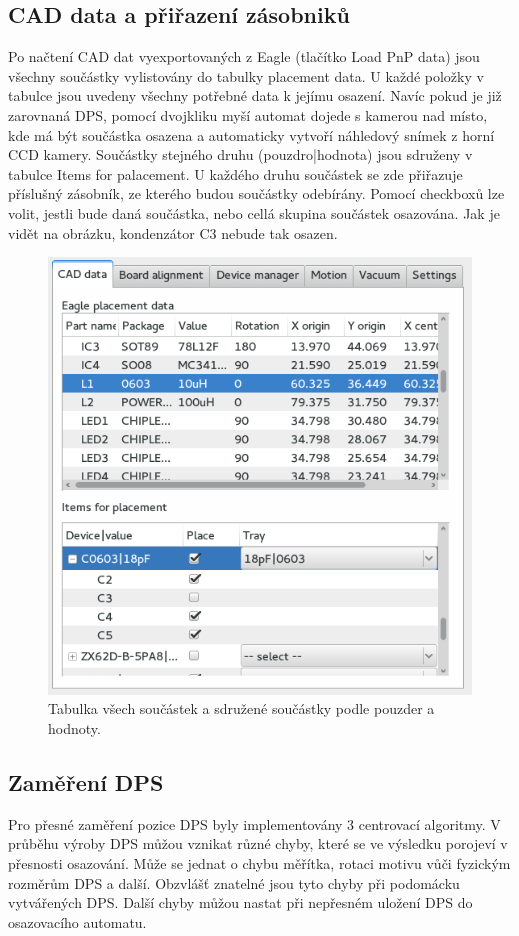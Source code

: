 \subsection{CAD data a přiřazení zásobniků}
Po načtení CAD dat vyexportovaných z Eagle (tlačítko Load PnP data) jsou všechny součástky vylistovány do tabulky placement data. U každé položky v tabulce jsou uvedeny všechny potřebné data k jejímu osazení. Navíc pokud je již zarovnaná DPS, pomocí dvojkliku myší automat dojede s kamerou nad místo, kde má být součástka osazena a automaticky vytvoří náhledový snímek z horní CCD kamery.
Součástky stejného druhu (pouzdro|hodnota) jsou sdruženy v tabulce Items for palacement. U každého druhu součástek se zde přiřazuje příslušný zásobník, ze kterého budou součástky odebírány. Pomocí checkboxů lze volit, jestli bude daná součástka, nebo cellá skupina součástek osazována. Jak je vidět na obrázku, kondenzátor C3 nebude tak osazen.
\begin{figure}[h!]
  \centering
    \includegraphics[width=0.6\linewidth]{obrazky/sw7.png}%
    \caption{Tabulka všech součástek a sdružené součástky podle pouzder a hodnoty.}
\end{figure}

\subsection{Zaměření DPS}
Pro přesné zaměření pozice DPS byly implementovány 3 centrovací algoritmy. V průběhu výroby DPS můžou vznikat různé chyby, které se ve výsledku porojeví v přesnosti osazování. Může se jednat o chybu měřítka, rotaci motivu vůči fyzickým rozměrům DPS a další. Obzvlášť znatelné jsou tyto chyby při podomácku vytvářených DPS. Další chyby můžou nastat při nepřesném uložení DPS do osazovacího automatu.

